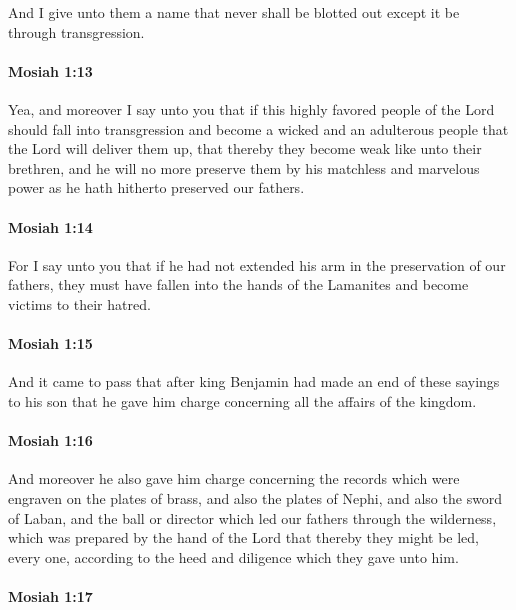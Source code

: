 			And I give unto them a name that never shall be blotted out
			except it be through transgression.

		\paragraph{Mosiah 1:13} %
			\label{MOSIAH-1-13}

			Yea, and moreover I say unto you that
			if this highly favored people of the Lord should fall into transgression
			and become a wicked and an adulterous people
			that the Lord will deliver them up,
			that thereby they become weak like unto their brethren,
			and he will no more preserve them by his matchless and marvelous power
			as he hath hitherto preserved our fathers.

		\paragraph{Mosiah 1:14} %
			\label{MOSIAH-1-14}

			For I say unto you that
			if he had not extended his arm in the preservation of our fathers,
			they must have fallen into the hands of the Lamanites
			and become victims to their hatred.

		\paragraph{Mosiah 1:15} %
			\label{MOSIAH-1-15}

			And it came to pass that
			after king Benjamin had made an end of these sayings to his son
			that he gave him charge concerning all the affairs of the kingdom.

		\paragraph{Mosiah 1:16} %
			\label{MOSIAH-1-16}

			And moreover he also gave him charge concerning the records
			which were engraven on the plates of brass,
			and also the plates of Nephi,
			and also the sword of Laban,
			and the ball or director which led our fathers through the wilderness,
			which was prepared by the hand of the Lord
			that thereby they might be led, every one,
			according to the heed and diligence which they gave unto him.

		\paragraph{Mosiah 1:17} %
			\label{MOSIAH-1-17}

